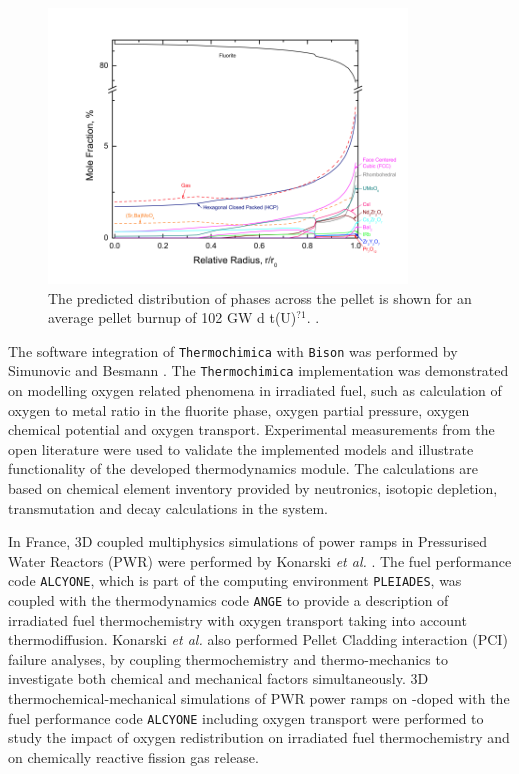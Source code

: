 	\begin{figure}[htbp]
		\begin{center}
		\includegraphics[width=0.85\textwidth]{figures/Piro_JNM}
		\caption{The predicted distribution of phases across the pellet is shown for an average pellet burnup of 102 GW d t(U)$^{?1}$. \cite{Piro13b}.}
		\label{fig:pirojnm}
		\end{center}
	\end{figure}
	
	The software integration of \texttt{Thermochimica} with \texttt{Bison} was performed by Simunovic and Besmann \cite{Besmann16}. The \texttt{Thermochimica} implementation was demonstrated on modelling oxygen related phenomena in irradiated fuel, such as calculation of oxygen to metal ratio in the fluorite phase, oxygen partial pressure, oxygen chemical potential and oxygen transport. Experimental measurements from the open literature were used to validate the implemented models and illustrate functionality of the developed thermodynamics module. The calculations are based on chemical element inventory provided by neutronics, isotopic depletion, transmutation and decay calculations in the \cite{SCALE05} system. 
	
	In France, 3D coupled multiphysics simulations of power ramps in Pressurised Water Reactors (PWR) were performed by Konarski \textit{et al.} \cite{KONARSKI2019104}. The fuel performance code \texttt{ALCYONE}, which is part of the computing environment \texttt{PLEIADES}, was coupled with the thermodynamics code \texttt{ANGE} to provide a description of irradiated fuel thermochemistry with oxygen transport taking into account thermodiffusion. Konarski \textit{et al.} also performed Pellet Cladding interaction (PCI) failure analyses, by coupling thermochemistry and thermo-mechanics to investigate both chemical and mechanical factors simultaneously. 3D thermochemical-mechanical simulations of PWR power ramps on -doped  with the fuel performance code \texttt{ALCYONE} including oxygen transport were performed to study the impact of oxygen redistribution on irradiated fuel thermochemistry and on chemically reactive fission gas release.

